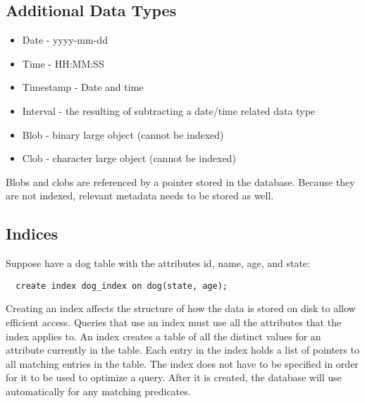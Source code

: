 \documentclass{math}
\begin{document}
\subsection*{Additional Data Types}
\begin{itemize}
  \item Date - yyyy-mm-dd
  \item Time - HH:MM:SS
  \item Timestamp - Date and time
  \item Interval - the resulting of subtracting a date/time related data type
  \item Blob - binary large object (cannot be indexed)
  \item Clob - character large object (cannot be indexed)
\end{itemize}
Blobs and clobs are referenced by a pointer stored in the database. Because
they are not indexed, relevant metadata needs to be stored as well.

\subsection*{Indices}
Suppose have a dog table with the attributes id, name, age, and state:
\begin{lstlisting}
  create index dog_index on dog(state, age);
\end{lstlisting}
Creating an index affects the structure of how the data is stored on disk to
allow efficient access. Queries that use an index must use all the
attributes that the index applies to. An index creates a table of all the
distinct values for an attribute currently in the table. Each entry in the
index holds a list of pointers to all matching entries in the table. The index
does not have to be specified in order for it to be used to optimize a query.
After it is created, the database will use automatically for any matching
predicates.
\end{document}
